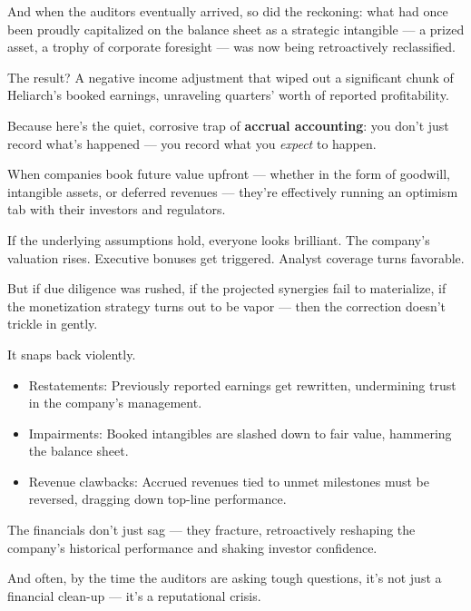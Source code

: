 \medskip

And when the auditors eventually arrived, so did the reckoning:
what had once been proudly capitalized on the balance sheet as a strategic intangible — a prized asset, a trophy of corporate foresight — was now being retroactively reclassified.

The result?
A negative income adjustment that wiped out a significant chunk of Heliarch’s booked earnings, unraveling quarters’ worth of reported profitability.

Because here’s the quiet, corrosive trap of \textbf{accrual accounting}:
you don’t just record what’s happened — you record what you \textit{expect} to happen.

When companies book future value upfront — whether in the form of goodwill, intangible assets, or deferred revenues — they’re effectively running an optimism tab with their investors and regulators.

If the underlying assumptions hold, everyone looks brilliant.
The company’s valuation rises. Executive bonuses get triggered. Analyst coverage turns favorable.

But if due diligence was rushed, if the projected synergies fail to materialize, if the monetization strategy turns out to be vapor —
then the correction doesn’t trickle in gently.

It snaps back violently.
\begin{itemize}
\item Restatements: Previously reported earnings get rewritten, undermining trust in the company’s management.
\item Impairments: Booked intangibles are slashed down to fair value, hammering the balance sheet.
\item Revenue clawbacks: Accrued revenues tied to unmet milestones must be reversed, dragging down top-line performance.
\end{itemize}

\medskip

The financials don’t just sag — they fracture, retroactively reshaping the company’s historical performance and shaking investor confidence.

And often, by the time the auditors are asking tough questions, it’s not just a financial clean-up —
it’s a reputational crisis.

